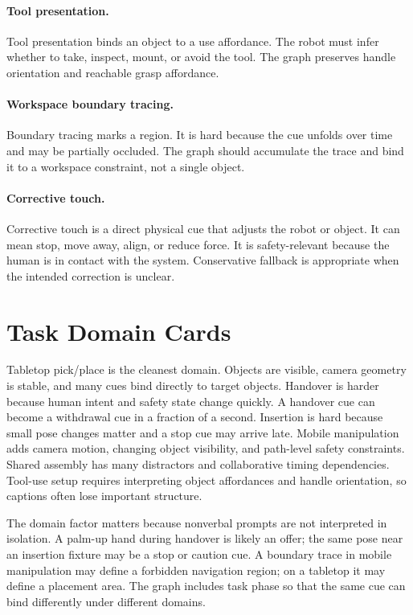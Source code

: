 \documentclass{article}
\begin{document}
\paragraph{Tool presentation.}
Tool presentation binds an object to a use affordance. The robot must infer whether to take, inspect, mount, or avoid the tool. The graph preserves handle orientation and reachable grasp affordance.

\paragraph{Workspace boundary tracing.}
Boundary tracing marks a region. It is hard because the cue unfolds over time and may be partially occluded. The graph should accumulate the trace and bind it to a workspace constraint, not a single object.

\paragraph{Corrective touch.}
Corrective touch is a direct physical cue that adjusts the robot or object. It can mean stop, move away, align, or reduce force. It is safety-relevant because the human is in contact with the system. Conservative fallback is appropriate when the intended correction is unclear.

\section{Task Domain Cards}

Tabletop pick/place is the cleanest domain. Objects are visible, camera geometry is stable, and many cues bind directly to target objects. Handover is harder because human intent and safety state change quickly. A handover cue can become a withdrawal cue in a fraction of a second. Insertion is hard because small pose changes matter and a stop cue may arrive late. Mobile manipulation adds camera motion, changing object visibility, and path-level safety constraints. Shared assembly has many distractors and collaborative timing dependencies. Tool-use setup requires interpreting object affordances and handle orientation, so captions often lose important structure.

The domain factor matters because nonverbal prompts are not interpreted in isolation. A palm-up hand during handover is likely an offer; the same pose near an insertion fixture may be a stop or caution cue. A boundary trace in mobile manipulation may define a forbidden navigation region; on a tabletop it may define a placement area. The graph includes task phase so that the same cue can bind differently under different domains.
\end{document}
